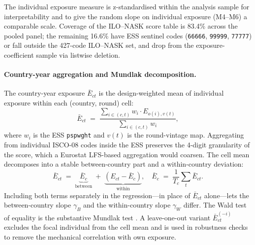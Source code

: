 The individual exposure measure is z-standardised within the analysis
sample for interpretability and to give the random slope on individual
exposure (M4--M6) a comparable scale. Coverage of the ILO--NASK score
table is 83.4\% across the pooled panel; the remaining 16.6\% have
ESS sentinel codes (\texttt{66666}, \texttt{99999}, \texttt{77777})
or fall outside the 427-code ILO--NASK set, and drop from the
exposure-coefficient sample via listwise deletion.

\paragraph{Country-year aggregation and Mundlak decomposition.}
The country-year exposure $\bar E_{ct}$ is the design-weighted mean of
individual exposure within each (country, round) cell:
\begin{equation}
\bar E_{ct} \;=\; \frac{\sum_{i \in (c,t)} w_i \cdot E_{o(i),v(t)}}
                       {\sum_{i \in (c,t)} w_i},
\label{eq:cellmean}
\end{equation}
where $w_i$ is the ESS \texttt{pspwght} and $v(t)$ is the round-vintage
map. Aggregating from individual ISCO-08 codes inside the ESS preserves
the 4-digit granularity of the score, which a Eurostat LFS-based
aggregation would coarsen. The cell mean decomposes into a stable
between-country part and a within-country deviation:
\[
  \bar E_{ct} \;=\;
  \underbrace{\bar E_c}_{\text{between}}
  \;+\;
  \underbrace{(E_{ct}-\bar E_c)}_{\text{within}},
  \quad
  \bar E_c \;=\; \frac{1}{T_c}\sum_{t} \bar E_{ct}.
\]
Including both terms separately in the regression---in place of
$\bar E_{ct}$ alone---lets the between-country slope $\gamma_B$ and the
within-country slope $\gamma_W$ differ. The Wald test of equality is
the substantive Mundlak test \citep{Mundlak1978}. A leave-one-out
variant $\bar E_{ct}^{(-i)}$ excludes the focal individual from the
cell mean and is used in robustness checks to remove the mechanical
correlation with own exposure.

